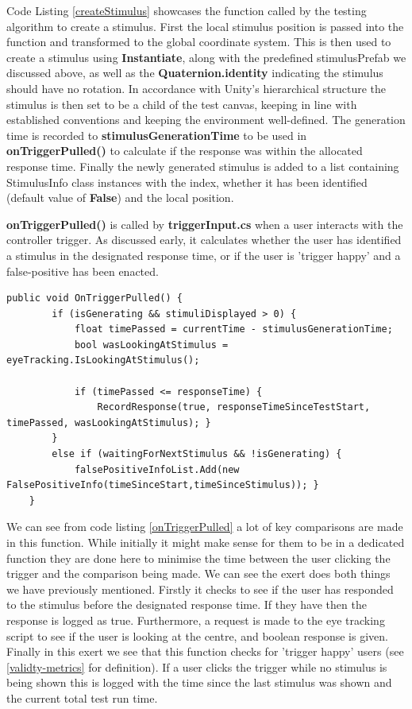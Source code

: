 \documentclass{l4proj}
\begin{document}
\newpage
Code Listing \ref{createStimulus} showcases the function called by the testing algorithm to create a stimulus. First the local stimulus position is passed into the function and transformed to the global coordinate system. This is then used to create a stimulus using \textbf{Instantiate}, along with the predefined stimulusPrefab we discussed above, as well as the \textbf{Quaternion.identity} indicating the stimulus should have no rotation. In accordance with Unity's hierarchical structure the stimulus is then set to be a child of the test canvas, keeping in line with established conventions and keeping the environment well-defined. The generation time is recorded to \textbf{stimulusGenerationTime} to be used in \textbf{onTriggerPulled()} to calculate if the response was within the allocated response time. Finally the newly generated stimulus is added to a list containing StimulusInfo class instances with the index, whether it has been identified (default value of \textbf{False}) and the local position.

\textbf{onTriggerPulled()} is called by \textbf{triggerInput.cs} when a user interacts with the controller trigger. As discussed early, it calculates whether the user has identified a stimulus in the designated response time, or if the user is 'trigger happy' and a false-positive has been enacted.
\begin{lstlisting}[language={[Sharp]C}, float=htbp, caption={Exert showing how OnTriggerPulled() makes comparisons during the test. This is because its the first function called by triggerInput, minimising the comparison time from when the user actually pressed the trigger.}]
    public void OnTriggerPulled() {
        if (isGenerating && stimuliDisplayed > 0) {
            float timePassed = currentTime - stimulusGenerationTime;
            bool wasLookingAtStimulus = eyeTracking.IsLookingAtStimulus();

            if (timePassed <= responseTime) {
                RecordResponse(true, responseTimeSinceTestStart, timePassed, wasLookingAtStimulus); }
        }
        else if (waitingForNextStimulus && !isGenerating) {
            falsePositiveInfoList.Add(new FalsePositiveInfo(timeSinceStart,timeSinceStimulus)); }
    }
\end{lstlisting} \label{onTriggerPulled}
\newline
We can see from code listing \ref{onTriggerPulled} a lot of key comparisons are made in this function. While initially it might make sense for them to be in a dedicated function they are done here to minimise the time between the user clicking the trigger and the comparison being made. We can see the exert does both things we have previously mentioned. Firstly it checks to see if the user has responded to the stimulus before the designated response time. If they have then the response is logged as true. Furthermore, a request is made to the eye tracking script to see if the user is looking at the centre, and  boolean response is given. Finally in this exert we see that this function checks for 'trigger happy' users (see \ref{validty-metrics} for definition). If a user clicks the trigger while no stimulus is being shown this is logged with the time since the last stimulus was shown and the current total test run time.
\end{document}

